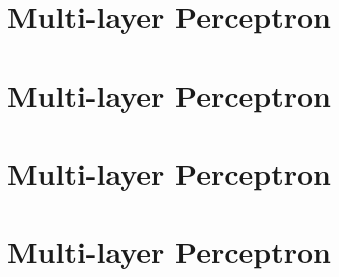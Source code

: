 \documentclass[11pt, openany]{book}              %
\begin{document}
\chapter{Multi-layer Perceptron}

\chapter{Multi-layer Perceptron}

\chapter{Multi-layer Perceptron}

\chapter{Multi-layer Perceptron}

 
\end{document}
